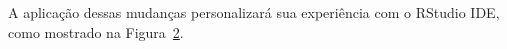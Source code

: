 \documentclass[
  letterpaper,
]{book}
\theoremstyle{plain}
\theoremstyle{definition}
\theoremstyle{remark}
\begin{document}
\begin{figure}


\caption{\label{fig-font-size-dark-theme}}

\end{figure}%

A aplicação dessas mudanças personalizará sua experiência com o RStudio
IDE, como mostrado na Figura~\ref{fig-customize-rstudio-ide}.

\begin{figure}


\caption{\label{fig-customize-rstudio-ide}}

\end{figure}%
\end{document}
